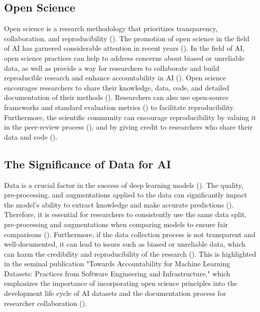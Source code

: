 \documentclass{IEEEtran}
\begin{document}
\subsection{Open Science}

Open science is a research methodology that prioritizes transparency, collaboration, and reproducibility (\cite{nielsen2011reinventing}). The promotion of open science in the field of AI has garnered considerable attention in recent years (\cite{accountabilityInAi,gundersen2018reproducible,leakage-recrisis,scully-debt-ml,stodden-towardreprodicibleresearch,coro2020open,braun2018open,hicks2021open,burgelman2019open}). In the field of AI, open science practices can help to address concerns about biased or unreliable data, as well as provide a way for researchers to collaborate and build reproducible research and enhance accountability in AI (\cite{accountabilityInAi,stodden-towardreprodicibleresearch}).  Open science encourages researchers to share their knowledge, data, code, and detailed documentation of their methods (\cite{hutson2018artificial,accountabilityInAi}). 
Researchers can also use open-source frameworks and standard evaluation metrics (\cite{gundersen2018reproducible}) to facilitate reproducibility. Furthermore, the scientific community can encourage reproducibility by valuing it in the peer-review process (\cite{scully-debt-ml}), and by giving credit to researchers who share their data and code (\cite{scully-debt-ml,credit-datasharing,stodden-towardreprodicibleresearch}).




\subsection{The Significance of Data for AI}

Data is a crucial factor in the success of deep learning models (\cite{lecun2015deep}). The quality, pre-processing, and augmentations applied to the data can significantly impact the model's ability to extract knowledge and make accurate predictions (\cite{shorten2019survey}). Therefore, it is essential for researchers to consistently use the same data split, pre-processing and augmentations when comparing models to ensure fair comparisons (\cite{caton2020fairness,mehrabi2021survey, leakage-recrisis}). Furthermore, if the data collection process is not transparent and well-documented, it can lead to issues such as biased or unreliable data, which can harm the credibility and reproducibility of the research (\cite{accountabilityInAi}). 
 This is highlighted in the seminal publication "Towards Accountability for Machine Learning Datasets: Practices from Software Engineering and Infrastructure," which emphasizes the importance of incorporating open science principles into the development life cycle of AI datasets and the documentation process for researcher collaboration (\cite{accountabilityInAi}).
\end{document}
